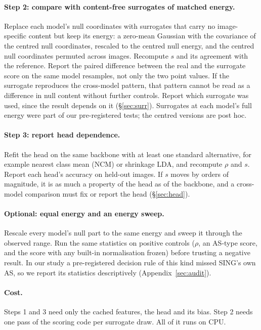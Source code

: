 \documentclass[10pt]{article}
\begin{document}
\paragraph{Step 2: compare with content-free surrogates of matched energy.}
Replace each model's null coordinates with surrogates that carry no image-specific content but keep its energy: a zero-mean Gaussian with the covariance of the centred null coordinates, rescaled to the centred null energy, and the centred null coordinates permuted across images. Recompute $s$ and its agreement with the reference. Report the paired difference between the real and the surrogate score on the same model resamples, not only the two point values. If the surrogate reproduces the cross-model pattern, that pattern cannot be read as a difference in null content without further controls. Report which surrogate was used, since the result depends on it (\S\ref{sec:surr}). Surrogates at each model's full energy were part of our pre-registered tests; the centred versions are post hoc.

\paragraph{Step 3: report head dependence.}
Refit the head on the same backbone with at least one standard alternative, for example nearest class mean (NCM) or shrinkage LDA, and recompute $\rho$ and $s$. Report each head's accuracy on held-out images. If $s$ moves by orders of magnitude, it is as much a property of the head as of the backbone, and a cross-model comparison must fix or report the head (\S\ref{sec:head}).

\paragraph{Optional: equal energy and an energy sweep.}
Rescale every model's null part to the same energy and sweep it through the observed range. Run the same statistics on positive controls ($\rho$, an AS-type score, and the score with any built-in normalisation frozen) before trusting a negative result. In our study a pre-registered decision rule of this kind missed SING's own AS, so we report its statistics descriptively (Appendix~\ref{sec:audit}).

\paragraph{Cost.}
Steps 1 and 3 need only the cached features, the head and its bias. Step 2 needs one pass of the scoring code per surrogate draw. All of it runs on CPU.
\end{document}
